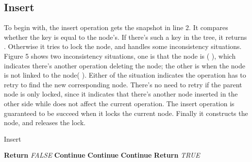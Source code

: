 \documentclass{article}
\begin{document}
\subsection{Insert}
To begin with, the insert operation gets the snapshot in line 2. It compares whether the key is equal to the  node's. If there's such a key in the tree, it returns . Otherwise it tries to lock the node, and handles some inconsistency situations. Figure 5 shows two inconsistency situations, one is that the  node is ( ), which indicates there's another operation deleting the  node; the other is when the  node is not linked to the  node( ). Either of the situation indicates the operation has to retry to find the new corresponding node. There's no need to retry if the parent node is only locked, since it indicates that there's another node inserted in the other side while does not affect the current operation. The insert operation is guaranteed to be succeed when it locks the current node. Finally it constructs the node, and releases the lock.
\begin{algorithm}
\caption{Insert}
\begin{algorithmic}[1]
    \While {}
        \State 
        \If {}
            \State \textbf{Return} \textit{FALSE}
        \EndIf
        \If {}
            \State \textbf{Continue}
        \EndIf
        \If {}
            \State 
            \State \textbf{Continue}
        \EndIf
            \State 
            \State \textbf{Continue}
        \EndIf
        \State {}   
        \If {}
            \State 
        \Else
            \State 
        \EndIf
        \State 
        \State \textbf{Return} \textit{TRUE}
    \EndWhile
\end{algorithmic}
\end{algorithm}
\end{document}
